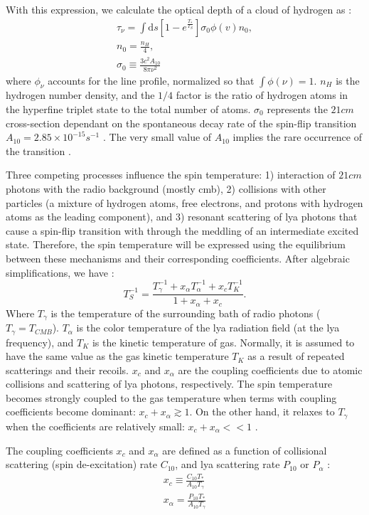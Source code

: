 \documentclass[12pt, TexShade, letterpaper]{report}
\begin{document}
With this expression, we calculate the optical depth of a cloud of hydrogen as \cite{21century, low_frequency}:
\begin{gather}
    \tau_\nu=\int \mathrm{d} s\left[1- e^{ \frac {T_*}{ T_S}}\right] \sigma_0 \phi(v) n_0 ,\\
    n_0 =\frac{n_H}{4},\\
    \sigma_0 \equiv \frac{3c^2 A_{10}}{8\pi \nu^2}
\end{gather}
where $\phi_\nu$ accounts for the line profile, normalized so that $\int \phi \left(\nu\right) =1$. $n_H$ is the hydrogen number density, and the $1/4$ factor is the ratio of hydrogen atoms in the hyperfine triplet state to the total number of atoms. $\sigma_0$ represents the $21cm$ cross-section dependant on the spontaneous decay rate of the spin-flip transition $A_{10} = 2.85 \times 10^{-15} s^{-1}$ \cite{21century, low_frequency}. The very small value of $A_{10}$ implies the rare occurrence of the transition \cite{kit_thesis}. 

Three competing processes influence the spin temperature: 1) interaction of $21cm$ photons with the radio background (mostly \gls{cmb}), 2) collisions with other particles (a mixture of hydrogen atoms, free electrons, and protons with hydrogen atoms as the leading component), and 3) resonant scattering of \gls{lya} photons that cause a spin-flip transition with through the meddling of an intermediate excited state. Therefore, the spin temperature will be expressed using the equilibrium between these mechanisms and their corresponding coefficients. After algebraic simplifications, we have \cite{low_frequency,21century}:
\begin{equation}
    T^{-1}_S = \frac{T^{-1}_\gamma + x_\alpha T^{-1}_\alpha + x_c T^{-1}_K}{1 + x_\alpha + x_c}.
\end{equation}
Where $T_\gamma$ is the temperature of the surrounding bath of radio photons ($T_\gamma = T_{CMB}$). $T_\alpha$ is the color temperature of the \gls{lya} radiation field (at the \gls{lya} frequency), and $T_K$ is the kinetic temperature of gas. Normally, it is assumed to have the same value as the gas kinetic temperature $T_K$ as a result of repeated scatterings and their recoils. $x_c$ and $x_\alpha$ are the coupling coefficients due to atomic collisions and scattering of \gls{lya} photons, respectively. The spin temperature becomes strongly coupled to the gas temperature when terms with coupling coefficients become dominant: $x_c + x_\alpha \gtrsim 1$. On the other hand, it relaxes to $T_\gamma$ when the coefficients are relatively small: $x_c + x_\alpha << 1$ \cite{21century, low_frequency}. \par
The coupling coefficients $x_c$ and $x_\alpha$ are defined as a function of collisional scattering (spin de-excitation) rate $C_{10}$, and \gls{lya} scattering rate $P_{10}$ or $P_\alpha$ \cite{explore_cosmic_dawn, low_frequency}:
\begin{gather}
    x_c \equiv \frac{C_{10}T_*}{A_{10}T_\gamma}\\
    x_\alpha = \frac{P_{10} T_*}{A_{10}T_\gamma} \label{eq:x_a}
\end{gather}
\end{document}
